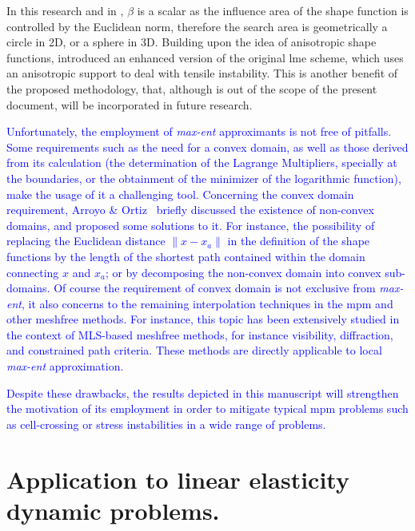 \documentclass[preprint,12pt,a4paper]{elsarticle}
\begin{document}
In this research and in \cite{Arroyo2006}, $\beta$ is a scalar as the
influence area of the shape function is controlled by the Euclidean
norm, therefore the search area is geometrically a circle in 2D, or a
sphere in 3D. Building upon the idea of anisotropic shape functions,
\cite{Kochmann2019} introduced an enhanced version of the original
\acrshort{lme} scheme, which uses an anisotropic support to deal with 
tensile instability. This is another benefit of the proposed methodology, that, although is out of the scope of the present document, will be incorporated in future research.

\textcolor{blue}{Unfortunately, the employment of \textit{max-ent} approximants is not free of pitfalls. Some requirements such as the need for a convex domain, as well as those derived from its calculation (the determination of the Lagrange Multipliers, specially at the boundaries, or the obtainment of the minimizer of the logarithmic function), make the usage of it a challenging tool. Concerning the convex domain requirement, Arroyo \& Ortiz~\cite{Arroyo2006} briefly discussed the existence of non-convex domains, and proposed some solutions to it. For instance, the possibility of replacing the Euclidean distance $\lVert x - x_a \rVert$ in the definition of the shape functions by the length of the shortest path contained within the domain connecting $x$ and $x_a$; or by decomposing the non-convex domain into convex sub-domains. Of course the requirement of convex domain is not exclusive from \textit{max-ent}, it also concerns to the remaining interpolation techniques in the \acrshort{mpm} and other meshfree methods. For instance, this topic has been extensively studied in the context of MLS-based meshfree methods, for instance visibility, diffraction, and constrained path criteria. These methods are directly applicable to local \textit{max-ent} approximation. }

\textcolor{blue}{Despite these drawbacks, the results depicted in this manuscript will strengthen the motivation of its employment in order to mitigate typical \acrshort{mpm} problems such as cell-crossing or stress instabilities in a wide range of problems.}

\section{Application to linear elasticity dynamic problems.}
\label{sec:Application-linear-elasticity-dynamic-problems}
\end{document}
